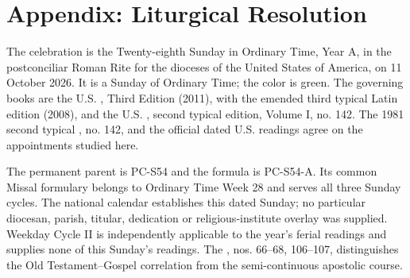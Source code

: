 \clearpage
\section{Appendix: Liturgical Resolution}
The celebration is the Twenty-eighth Sunday in Ordinary Time, Year A, in the postconciliar Roman Rite for the dioceses of the United States of America, on 11 October 2026. It is a Sunday of Ordinary Time; the color is green. The governing books are the U.S. , Third Edition (2011), with the emended third typical Latin edition (2008), and the U.S. , second typical edition, Volume I, no. 142. The 1981 second typical , no. 142, and the official dated U.S. readings agree on the appointments studied here.

The permanent parent is PC-S54 and the formula is PC-S54-A. Its common Missal formulary belongs to Ordinary Time Week 28 and serves all three Sunday cycles. The national calendar establishes this dated Sunday; no particular diocesan, parish, titular, dedication or religious-institute overlay was supplied. Weekday Cycle II is independently applicable to the year's ferial readings and supplies none of this Sunday's readings. The , nos. 66--68, 106--107, distinguishes the Old Testament--Gospel correlation from the semi-continuous apostolic course.

